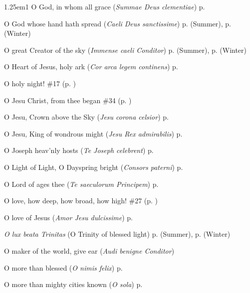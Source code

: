 \begin{hangparas}{1.25em}{1}
O God, in whom all grace (\textit{Summae Deus clementiae}) \dotfill p. \pageref{SevenSorrowsMattins}
\par\noindent
O God whose hand hath spread (\textit{Caeli Deus sanctissime}) \dotfill p. \pageref{WednesdayEvensongSummer} (Summer), p. \pageref{WednesdayEvensongWinter} (Winter)
\par\noindent
O great Creator of the sky (\textit{Immense caeli Conditor}) \dotfill p. \pageref{MondayEvensongSummer} (Summer), p. \pageref{MondayEvensongWinter} (Winter)
\par\noindent
O Heart of Jesus, holy ark (\textit{Cor arca legem continens}) \dotfill p. \pageref{CompassionMattins}
\par\noindent
O holy night! \dotfill \#17 (p. \pageref{Hymn17})
\par\noindent
O Jesu Christ, from thee began \dotfill \#34 (p. \pageref{Hymn34})
\par\noindent
O Jesu, Crown above the Sky (\textit{Jesu corona celsior}) \dotfill p. \pageref{ConfessorNotBishopMattins}
\par\noindent
O Jesu, King of wondrous might (\textit{Jesu Rex admirabilis}) \dotfill p. \pageref{HolyNameInvitatoryHymn}
\par\noindent
O Joseph heav'nly hosts (\textit{Te Joseph celebrent}) \dotfill p. \pageref{JosephEvensong}
\par\noindent
O Light of Light, O Dayspring bright (\textit{Consors paterni}) \dotfill p. \pageref{TuesdayInvitatory}
\par\noindent
O Lord of ages thee (\textit{Te saeculorum Principem}) \dotfill p. \pageref{ChristTheKingEvensong}
\par\noindent
O love, how deep, how broad, how high! \dotfill \#27 (p. \pageref{Hymn27})
\par\noindent
O love of Jesus (\textit{Amor Jesu dulcissime}) \dotfill p. \pageref{TransfigurationMattins}
\par\noindent
\textit{O lux beata Trinitas} (O Trinity of blessed light) \dotfill p. \pageref{SaturdayEvensongSummer} (Summer), p. \pageref{SaturdayEvensongWinter} (Winter)
\par\noindent
O maker of the world, give ear (\textit{Audi benigne Conditor}) 
\par\noindent
O more than blessed (\textit{O nimis felix}) \dotfill p. \pageref{JohnBaptistMattins}
\par\noindent
O more than mighty cities known (\textit{O sola}) \dotfill p. \pageref{EpiphanyMattinsHymn}

\end{hangparas}
